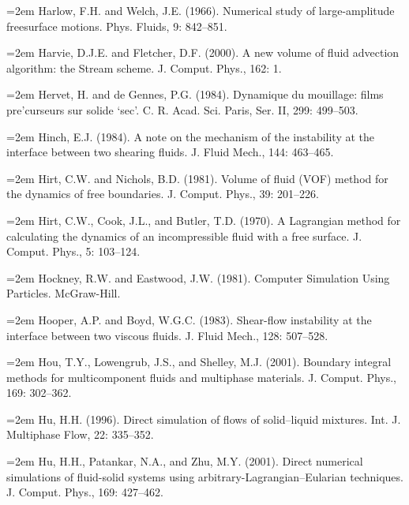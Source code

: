 \documentclass[11pt,a4paper,openany,fontset=none]{ctexbook}
\begin{document}
\par\hangindent=2em Harlow, F.H. and Welch, J.E. (1966). Numerical study of large-amplitude freesurface motions. Phys. Fluids, 9: 842--851.

\par\hangindent=2em Harvie, D.J.E. and Fletcher, D.F. (2000). A new volume of fluid advection algorithm: the Stream scheme. J. Comput. Phys., 162: 1.

\par\hangindent=2em Hervet, H. and de Gennes, P.G. (1984). Dynamique du mouillage: films pre'curseurs sur solide ‘sec’. C. R. Acad. Sci. Paris, Ser. II, 299: 499--503.

\par\hangindent=2em Hinch, E.J. (1984). A note on the mechanism of the instability at the interface between two shearing fluids. J. Fluid Mech., 144: 463--465.


\par\hangindent=2em Hirt, C.W. and Nichols, B.D. (1981). Volume of fluid (VOF) method for the dynamics of free boundaries. J. Comput. Phys., 39: 201--226.

\par\hangindent=2em Hirt, C.W., Cook, J.L., and Butler, T.D. (1970). A Lagrangian method for calculating the dynamics of an incompressible fluid with a free surface. J. Comput. Phys., 5: 103--124.

\par\hangindent=2em Hockney, R.W. and Eastwood, J.W. (1981). Computer Simulation Using Particles. McGraw-Hill.

\par\hangindent=2em Hooper, A.P. and Boyd, W.G.C. (1983). Shear-flow instability at the interface between two viscous fluids. J. Fluid Mech., 128: 507--528.

\par\hangindent=2em Hou, T.Y., Lowengrub, J.S., and Shelley, M.J. (2001). Boundary integral methods for multicomponent fluids and multiphase materials. J. Comput. Phys., 169: 302--362.

\par\hangindent=2em Hu, H.H. (1996). Direct simulation of flows of solid--liquid mixtures. Int. J. Multiphase Flow, 22: 335--352.

\par\hangindent=2em Hu, H.H., Patankar, N.A., and Zhu, M.Y. (2001). Direct numerical simulations of fluid-solid systems using arbitrary-Lagrangian--Eularian techniques. J. Comput. Phys., 169: 427--462.
\end{document}
